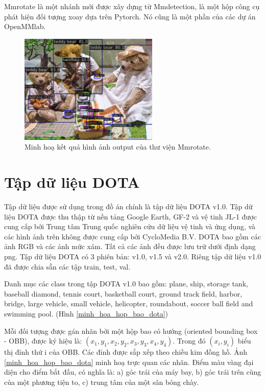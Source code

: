 \documentclass[12pt,a4paper,openany,oneside]{report}
\begin{document}
Mmrotate là một nhánh mới được xây dựng từ Mmdetection, là một hộp công cụ phát hiện đối tượng xoay dựa trên Pytorch. Nó cũng là một phần của các dự án OpenMMlab.

\begin{figure}[ht!]
	\begin{center}
		\includegraphics[width=250px]{./demo_mmrotate_result.jpg}
		\caption{Minh hoạ kết quả hình ảnh output của thư viện Mmrotate.}
		\label{demo_mmrotate_result}
	\end{center}
\end{figure} 

\section{Tập dữ liệu DOTA} 

Tập dữ liệu được sử dụng trong đồ án chính là tập dữ liệu DOTA v1.0. Tập dữ liệu DOTA được thu thập từ nền tảng Google Earth, GF-2 và vệ tinh JL-1 được cung cấp bởi Trung tâm Trung quốc nghiên cứu dữ liệu vệ tinh và ứng dụng, và các hình ảnh trên không được cung cấp bởi CycloMedia B.V. DOTA bao gồm các ảnh RGB và các ảnh mức xám. Tất cả các ảnh đều được lưu trữ dưới định dạng png. Tập dữ liệu DOTA có 3 phiên bản: v1.0, v1.5 và v2.0. Riêng tập dữ liệu v1.0 đã được chia sẵn các tập train, test, val.

Danh mục các class trong tập DOTA v1.0 bao gồm: plane, ship, storage tank, baseball diamond, tennis court, basketball court, ground track field, harbor, bridge, large vehicle, small vehicle, helicopter, roundabout, soccer ball field and swimming pool. (Hình \ref{minh_hoa_hop_bao_dota})

Mỗi đối tượng được gán nhãn bởi một hộp bao có hướng (oriented bounding box - OBB), được ký hiệu là: $(x_1, y_1, x_2, y_2, x_3, y_3, x_4, y_4)$. Trong đó $(x_i, y_i)$ biểu thị đỉnh thứ i của OBB. Các đỉnh được sắp xếp theo chiều kim đồng hồ. Ảnh \ref{minh_hoa_hop_bao_dota} minh hoạ trực quan các nhãn. Điểm màu vàng đại diện cho điểm bắt đầu, có nghĩa là: a) góc trái của máy bay, b) góc trái trên cùng của một phương tiện to, c) trung tâm của một sân bóng chày.
\end{document}
